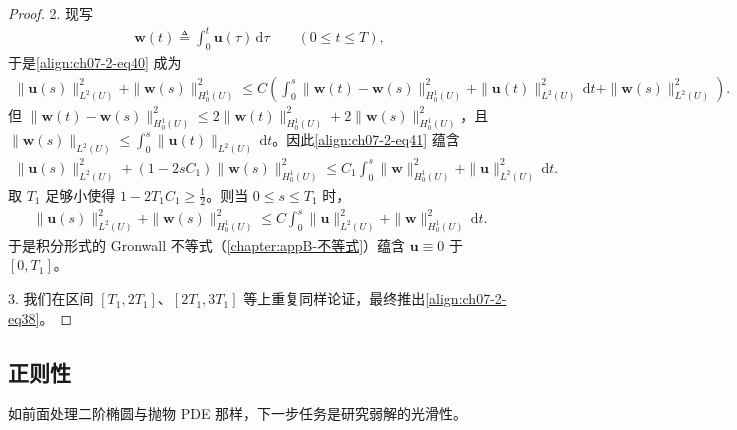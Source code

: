 \documentclass[../../main.tex]{subfiles}
\begin{document}
\begin{proof}
2. 现写
\begin{align}
\mathbf{w}(t)\triangleq \int_0^t \mathbf{u}(\tau)\,\mathrm{d}\tau\qquad (0\leqslant t\leqslant T),\label{align:ch07-2-eq41}
\end{align}
于是\eqref{align:ch07-2-eq40} 成为
\begin{align*}
\|\mathbf{u}(s)\|_{L^2(U)}^2+\|\mathbf{w}(s)\|_{H^1_0(U)}^2
\leqslant C\left(\int_0^s \|\mathbf{w}(t)-\mathbf{w}(s)\|_{H^1_0(U)}^2+\|\mathbf{u}(t)\|_{L^2(U)}^2\,\mathrm{d}t+\|\mathbf{w}(s)\|_{L^2(U)}^2\right).
\end{align*}
但 $\|\mathbf{w}(t)-\mathbf{w}(s)\|_{H^1_0(U)}^2\leqslant 2\|\mathbf{w}(t)\|_{H^1_0(U)}^2+2\|\mathbf{w}(s)\|_{H^1_0(U)}^2$，且 $\|\mathbf{w}(s)\|_{L^2(U)}\leqslant\int_0^s\|\mathbf{u}(t)\|_{L^2(U)}\,\mathrm{d}t$。因此\eqref{align:ch07-2-eq41} 蕴含
\begin{align*}
\|\mathbf{u}(s)\|_{L^2(U)}^2+(1-2sC_1)\|\mathbf{w}(s)\|_{H^1_0(U)}^2
\leqslant C_1\int_0^s \|\mathbf{w}\|_{H^1_0(U)}^2+\|\mathbf{u}\|_{L^2(U)}^2\,\mathrm{d}t.
\end{align*}
取 $T_1$ 足够小使得 $1-2T_1C_1\geqslant\frac12$。则当 $0\leqslant s\leqslant T_1$ 时，
\begin{align*}
\|\mathbf{u}(s)\|_{L^2(U)}^2+\|\mathbf{w}(s)\|_{H^1_0(U)}^2
\leqslant C\int_0^s \|\mathbf{u}\|_{L^2(U)}^2+\|\mathbf{w}\|_{H^1_0(U)}^2\,\mathrm{d}t.
\end{align*}
于是积分形式的 Gronwall 不等式（\cref{chapter:appB-不等式}）蕴含 $\mathbf{u}\equiv 0$ 于 $[0,T_1]$。

3. 我们在区间 $[T_1,2T_1]$、$[2T_1,3T_1]$ 等上重复同样论证，最终推出\eqref{align:ch07-2-eq38}。
\end{proof}

\subsection{正则性}\label{subsection:ch07-2-3-正则性}

如前面处理二阶椭圆与抛物 PDE 那样，下一步任务是研究弱解的光滑性。
\end{document}
